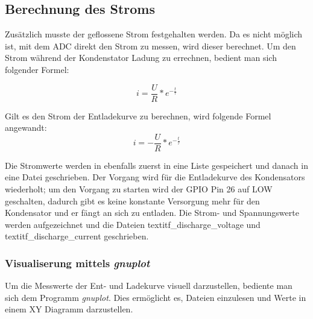 \documentclass{article}
\begin{document}
\subsection{Berechnung des Stroms}
Zusätzlich musste der geflossene Strom festgehalten werden. Da es nicht möglich ist, mit dem ADC direkt den Strom zu messen, wird dieser berechnet.
Um den Strom während der Kondenstator Ladung zu errechnen, bedient man sich folgender Formel:

\begin{equation}
    i=\frac{U}{R} * e^{-\frac{t}{\tau}}
\end{equation}

Gilt es den Strom der Entladekurve zu berechnen, wird folgende Formel angewandt:
\begin{equation}
    i=-\frac{U}{R} * e^{-\frac{t}{\tau}}
\end{equation}

Die Stromwerte werden in ebenfalls zuerst in eine Liste gespeichert und danach in eine Datei geschrieben.
Der Vorgang wird für die Entladekurve des Kondensators wiederholt; um den Vorgang zu starten wird der GPIO Pin 26 auf LOW geschalten, 
dadurch gibt es keine konstante Versorgung mehr für den Kondensator und er fängt an sich zu entladen.
Die Strom- und Spannungswerte werden aufgezeichnet und die Dateien textit{f\_discharge\_voltage} und textit{f\_discharge\_current} geschrieben.

\subsubsection{Visualiserung mittels \textit{gnuplot}}
Um die Messwerte der Ent- und Ladekurve visuell darzustellen, bediente man sich dem Programm \textit{gnuplot}. 
Dies ermöglicht es, Dateien einzulesen und Werte in einem XY Diagramm darzustellen. \\
\end{document}
